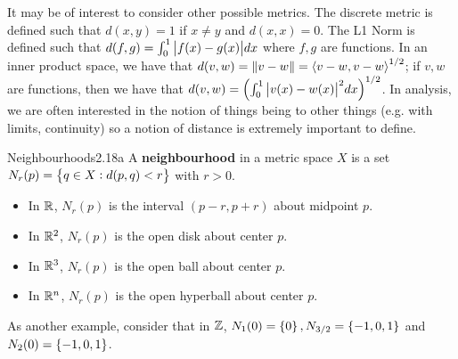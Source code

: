 \noindent It may be of interest to consider other possible metrics. The discrete metric is defined such that $d(x, y) = 1$ if $x \neq y$ and $d(x, x) = 0$. The L1 Norm is defined such that $d(f, g) = \int_0^1 \abs{f(x) - g(x)} dx$ where $f, g$ are functions. In an inner product space, we have that $d(v, w) = \norm{v - w} = \left< v-w, v-w \right>^{1/2}$; if $v, w$ are functions, then we have that $d(v, w) = \left(\int_0^1\abs{v(x) - w(x)}^2 dx\right)^{1/2}$. In analysis, we are often interested in the notion of things being  to other things (e.g. with limits, continuity) so a notion of distance is extremely important to define.

\setcounter{rudin}{17}
\begin{definition}{Neighbourhoods}{2.18a}
    A \textbf{neighbourhood} in a metric space $X$ is a set $N_r(p) = \set{q \in X: d(p, q) < r}$ with $r > 0$. 
\end{definition}

\begin{nexample}{}
    \begin{itemize}
        \item In $\mathbb{R}$, $N_r(p)$ is the interval $(p - r, p + r)$ about midpoint $p$.
        \item In $\mathbb{R}^2$, $N_r(p)$ is the open disk about center $p$. 
        \item In $\mathbb{R}^3$, $N_r(p)$ is the open ball about center $p$.
        \item In $\mathbb{R}^n$, $N_r(p)$ is the open hyperball about center $p$. 
    \end{itemize}
\end{nexample}
\noindent As another example, consider that in $\mathbb{Z}$, $N_1(0) = \set{0}, N_{3/2} = \set{-1, 0, 1}$ and $N_2(0) = \set{-1, 0, 1}$.
\setcounter{rudin}{17}

